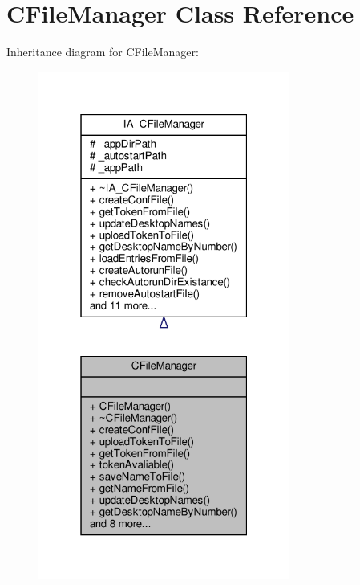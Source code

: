\hypertarget{classCFileManager}{}\section{C\+File\+Manager Class Reference}
\label{classCFileManager}


Inheritance diagram for C\+File\+Manager\+:
\nopagebreak
\begin{figure}[H]
\begin{center}
\leavevmode
\includegraphics[width=235pt]{classCFileManager__inherit__graph}
\end{center}
\end{figure}


